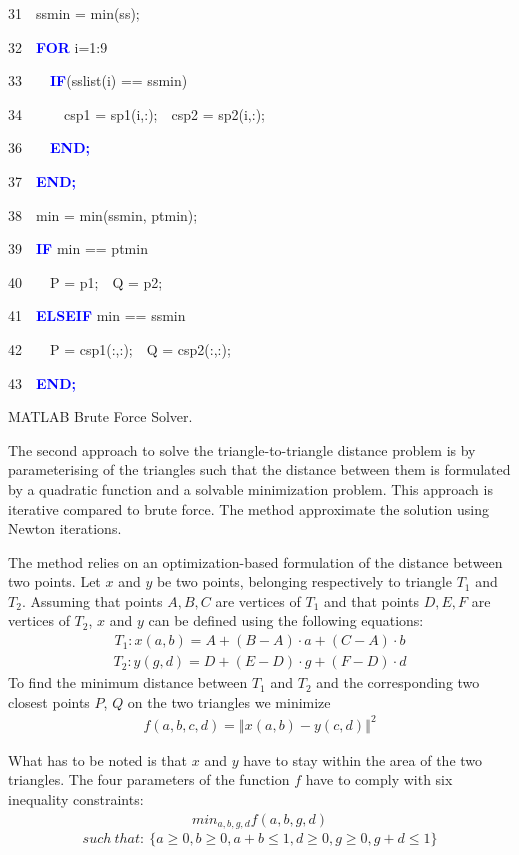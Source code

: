 \documentclass[times,12pt]{article}
\begin{document}
\begin{algorithm}
31~~ssmin = min(ss);

32~~\textbf{\textcolor{blue}{FOR}} i=1:9

33~~~~\textbf{\textcolor{blue}{IF}}(sslist(i) == ssmin)

34~~~~~~csp1 = sp1(i,:);~~csp2 = sp2(i,:);

36~~~~\textbf{\textcolor{blue}{END;}}

37~~\textbf{\textcolor{blue}{END;}}

38~~min = min(ssmin, ptmin);

39~~\textbf{\textcolor{blue}{IF}} min == ptmin

40~~~~P = p1;~~Q = p2;

41~~\textbf{\textcolor{blue}{ELSEIF}} min == ssmin

42~~~~P = csp1(:,:);~~Q = csp2(:,:);

43~~\textbf{\textcolor{blue}{END;}}
\protect\caption{\label{algobf}MATLAB Brute Force Solver.}
\end{algorithm}



The second approach to solve the triangle-to-triangle  distance problem is by parameterising of the triangles such that the distance between them is formulated by a quadratic function and a solvable minimization problem. This approach is iterative compared to brute force. The method approximate the solution using Newton iterations.

The method relies on an optimization-based formulation of the distance between two points. Let $x$ and $y$ be two points, belonging respectively to triangle $T_1$ and $T_2$. Assuming that points $A, B, C$ are vertices of $T_1$ and that points $D, E, F$ are vertices of $T_2$, $x$ and $y$ can be defined using the following equations: 
\begin{align*}
T_{1}:x(a,b)=A+(B-A) \cdot a+(C-A)\cdot b
\end{align*}
\begin{align*}
T_{2}:y(g,d)=D+(E-D) \cdot g+(F-D) \cdot d
\end{align*} 
To find the minimum distance between $T_1$ and $T_2$ and the corresponding two closest points $P$, $Q$ on the two triangles we minimize
\begin{align*}
f\left(a,b,c,d\right)=\left\Vert x\left(a,b\right)-y\left(c,d\right)\right\Vert ^{2}
\end{align*} 

What has to be noted is that $x$ and $y$ have to stay within the area of the two triangles. The four parameters of the function $f$ have to comply with six inequality constraints:
\begin{align*}
min_{a,b,g,d} f(a,b,g,d)
\end{align*}  
$$such \:that: \: \{a\geq0,b\geq0, a+b\leq1, d\geq0, g\geq0, g+d\leq1 \}$$ 
\end{document}
